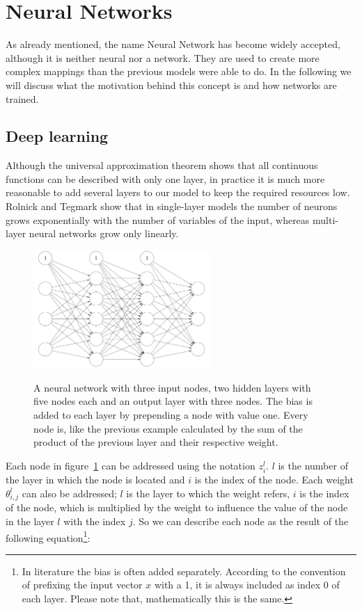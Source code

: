\section{Neural Networks} \label{ch:neural_networks}

As already mentioned, the name Neural Network has become widely accepted, although it is neither neural nor a network. %
They are used to create more complex mappings than the previous models were able to do.
In the following we will discuss what the motivation behind this concept is and how networks are trained.

\subsection{Deep learning} \label{ch:deep_learning}

Although the universal approximation theorem shows that all continuous functions can be described with only one layer, in practice it is much more reasonable to add several layers to our model to keep the required resources low.
Rolnick and Tegmark \cite{Rolnick2017} show that in single-layer models the number of neurons grows exponentially with the number of variables of the input, whereas multi-layer neural networks grow only linearly.

\begin{figure}
    \centering
    \caption[Neural Network]{ A neural network with three input nodes, two hidden layers with five nodes each and an output layer with three nodes. The bias is added to each layer by prepending a node with value one. Every node is, like the previous example calculated by the sum of the product of the previous layer and their respective weight.  }
    \includegraphics[width=0.6\textwidth]{images/2_nn_with_bias.png}
    \label{fig:nn}
\end{figure}

Each node in figure~\ref{fig:nn} can be addressed using the notation $z^l_i$.
$l$ is the number of the layer in which the node is located and $i$ is the index of the node.
Each weight $\theta^l_{i, j}$ can also be addressed; $l$ is the layer to which the weight refers, $i$ is the index of the node, which is multiplied by the weight to influence the value of the node in the layer $l$ with the index $j$.
So we can describe each node as the result of the following equation\footnote{In literature the bias is often added separately.
According to the convention of prefixing the input vector $x$ with a 1, it is always included as index 0 of each layer.
Please note that, mathematically this is the same.}:

